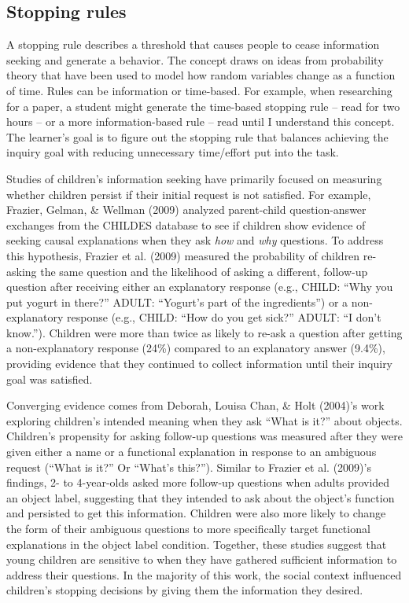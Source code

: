 \documentclass[oneside]{report}
\begin{document}
\subsection{Stopping rules}\label{stopping-rules}

A stopping rule describes a threshold that causes people to cease
information seeking and generate a behavior. The concept draws on ideas
from probability theory that have been used to model how random
variables change as a function of time. Rules can be information or
time-based. For example, when researching for a paper, a student might
generate the time-based stopping rule -- read for two hours -- or a more
information-based rule -- read until I understand this concept. The
learner's goal is to figure out the stopping rule that balances
achieving the inquiry goal with reducing unnecessary time/effort put
into the task.

Studies of children's information seeking have primarily focused on
measuring whether children persist if their initial request is not
satisfied. For example, Frazier, Gelman, \& Wellman (2009) analyzed
parent-child question-answer exchanges from the CHILDES database to see
if children show evidence of seeking causal explanations when they ask
\emph{how} and \emph{why} questions. To address this hypothesis, Frazier
et al. (2009) measured the probability of children re-asking the same
question and the likelihood of asking a different, follow-up question
after receiving either an explanatory response (e.g., CHILD: ``Why you
put yogurt in there?'' ADULT: ``Yogurt's part of the ingredients'') or a
non-explanatory response (e.g., CHILD: ``How do you get sick?'' ADULT:
``I don't know.''). Children were more than twice as likely to re-ask a
question after getting a non-explanatory response (24\%) compared to an
explanatory answer (9.4\%), providing evidence that they continued to
collect information until their inquiry goal was satisfied.

Converging evidence comes from Deborah, Louisa Chan, \& Holt (2004)'s
work exploring children's intended meaning when they ask ``What is it?''
about objects. Children's propensity for asking follow-up questions was
measured after they were given either a name or a functional explanation
in response to an ambiguous request (``What is it?'' Or ``What's
this?''). Similar to Frazier et al. (2009)'s findings, 2- to 4-year-olds
asked more follow-up questions when adults provided an object label,
suggesting that they intended to ask about the object's function and
persisted to get this information. Children were also more likely to
change the form of their ambiguous questions to more specifically target
functional explanations in the object label condition. Together, these
studies suggest that young children are sensitive to when they have
gathered sufficient information to address their questions. In the
majority of this work, the social context influenced children's stopping
decisions by giving them the information they desired.
\end{document}
